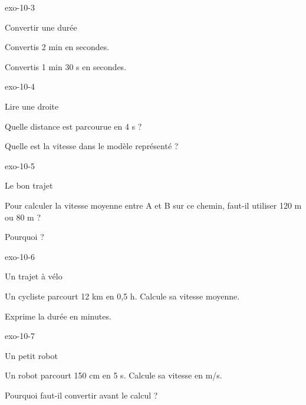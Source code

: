\documentclass[12pt,twoside,openany]{book}
\begin{document}
\begin{blocLivre}{exo-10-3}
\begin{exercice}[1]{Convertir une durée}
\begin{questions}
\item Convertis 2 min en secondes.
\item Convertis 1 min 30 s en secondes.
\end{questions}
\end{exercice}\end{blocLivre}
\begin{blocLivre}{exo-10-4}
\begin{exercice}[1]{Lire une droite}
\begin{questions}
\item Quelle distance est parcourue en 4 s ?
\item Quelle est la vitesse dans le modèle représenté ?
\end{questions}
\end{exercice}\end{blocLivre}
\begin{blocLivre}{exo-10-5}
\begin{exercice}[1]{Le bon trajet}
\begin{questions}
\item Pour calculer la vitesse moyenne entre A et B sur ce chemin, faut-il utiliser 120 m ou 80 m ?
\item Pourquoi ?
\end{questions}
\end{exercice}\end{blocLivre}
\begin{blocLivre}{exo-10-6}
\begin{exercice}[2]{Un trajet à vélo}
\begin{questions}
\item Un cycliste parcourt 12 km en 0,5 h. Calcule sa vitesse moyenne.
\item Exprime la durée en minutes.
\end{questions}
\end{exercice}\end{blocLivre}
\begin{blocLivre}{exo-10-7}
\begin{exercice}[2]{Un petit robot}
\begin{questions}
\item Un robot parcourt 150 cm en 5 s. Calcule sa vitesse en m/s.
\item Pourquoi faut-il convertir avant le calcul ?
\end{questions}
\end{exercice}\end{blocLivre}
\end{document}
